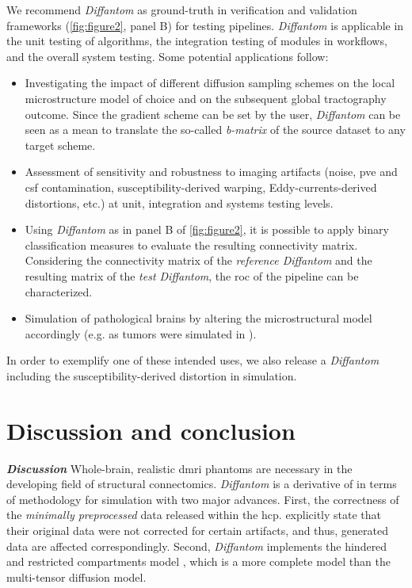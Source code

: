 \documentclass[english]{frontiers/frontiersSCNS} %
\begin{document}
We recommend \emph{Diffantom} as ground-truth in verification and validation frameworks
  (\autoref{fig:figure2}, panel B) for testing pipelines.
\emph{Diffantom} is applicable in the unit testing of algorithms, the integration testing of
  modules in workflows, and the overall system testing.
Some potential applications follow:
\begin{itemize}
  \item Investigating the impact of different diffusion sampling schemes on the local microstructure
    model of choice and on the subsequent global tractography outcome.
  Since the gradient scheme can be set by the user, \emph{Diffantom} can be seen as a mean to translate the so-called
  \emph{b-matrix} of the source dataset to any target scheme.
  \item Assessment of sensitivity and robustness to imaging artifacts (noise, \acrlong{pve} and \gls*{csf} contamination,
    susceptibility-derived warping, Eddy-currents-derived distortions, etc.) at unit, integration and systems testing levels.
  \item Using \emph{Diffantom} as in panel B of \autoref{fig:figure2}, it is possible to apply binary classification measures
    to evaluate the resulting connectivity matrix.
  Considering the connectivity matrix of the \emph{reference Diffantom} and the resulting
    matrix of the \emph{test Diffantom}, the \acrfull*{roc} of the pipeline can be characterized.
  \item Simulation of pathological brains by altering the microstructural
    model accordingly (e.g. as tumors were simulated in \cite{kaus_simulation_2000}).
\end{itemize}
In order to exemplify one of these intended uses, we also release a \emph{Diffantom} including the susceptibility-derived
  distortion in simulation.

\section*{Discussion and conclusion}
\noindent\textbf{\textit{Discussion\textcolon}}\label{sec:discussion} %
Whole-brain, realistic \gls*{dmri} phantoms are necessary in the developing field of structural
  connectomics.
\emph{Diffantom} is a derivative of \citep{wilkins_fiber_2014} in terms of methodology for
  simulation with two major advances.
First, the correctness of the \emph{minimally preprocessed} data \citep{glasser_minimal_2013}
  released within the \gls*{hcp}.
\cite{wilkins_fiber_2014} explicitly state that their original data were not corrected for certain artifacts,
  and thus, generated data are affected correspondingly.
Second, \emph{Diffantom} implements the hindered and restricted compartments model \citep{assaf_composite_2005},
  which is a more complete model than the multi-tensor diffusion model.
\end{document}

